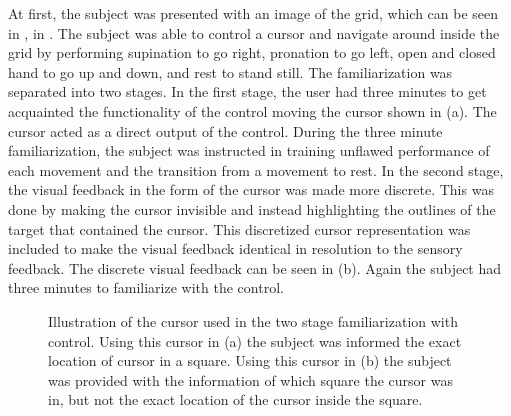 At first, the subject was presented with an image of the grid, which can be seen in , in . The subject was able to control a cursor and navigate around inside the grid by performing supination to go right, pronation to go left, open and closed hand to go up and down, and rest to stand still. The familiarization was separated into two stages. In the first stage, the user had three minutes to get acquainted the functionality of the control moving the cursor shown in  (a). The cursor acted as a direct output of the control. During the three minute familiarization, the subject was instructed in training unflawed performance of each movement and the transition from a movement to rest. In the second stage, the visual feedback in the form of the cursor was made more discrete. This was done by making the cursor invisible and instead highlighting the outlines of the target that contained the cursor. This discretized cursor representation was included to make the visual feedback identical in resolution to the sensory feedback. The discrete visual feedback can be seen in  (b). Again the subject had three minutes to familiarize with the control. 

\begin{figure}[H]
	\hspace{0.9cm}
	\caption{Illustration of the cursor used in the two stage familiarization with control.  Using this cursor in (a) the subject was informed the exact location of cursor in a square. Using this cursor in (b) the subject was provided with the information of which square the cursor was in, but not the exact location of the cursor inside the square. }
	\label{fig:C1}
\end{figure}


